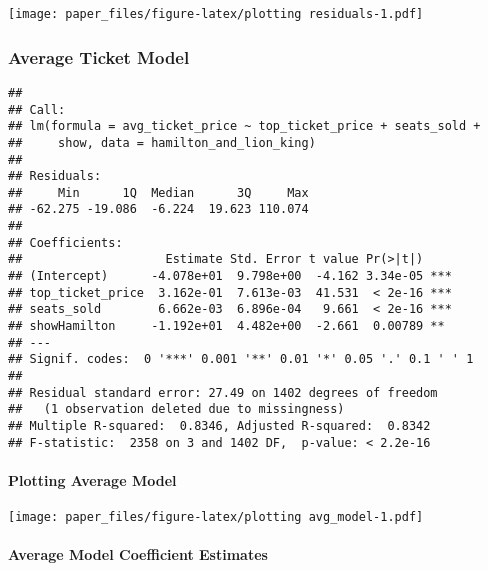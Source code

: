 \documentclass[
]{article}
\begin{document}
\texttt{[image: paper\_files/figure-latex/plotting residuals-1.pdf]}

\hypertarget{average-ticket-model}{%
\subsubsection{Average Ticket Model}\label{average-ticket-model}}

\begin{verbatim}
## 
## Call:
## lm(formula = avg_ticket_price ~ top_ticket_price + seats_sold + 
##     show, data = hamilton_and_lion_king)
## 
## Residuals:
##     Min      1Q  Median      3Q     Max 
## -62.275 -19.086  -6.224  19.623 110.074 
## 
## Coefficients:
##                    Estimate Std. Error t value Pr(>|t|)    
## (Intercept)      -4.078e+01  9.798e+00  -4.162 3.34e-05 ***
## top_ticket_price  3.162e-01  7.613e-03  41.531  < 2e-16 ***
## seats_sold        6.662e-03  6.896e-04   9.661  < 2e-16 ***
## showHamilton     -1.192e+01  4.482e+00  -2.661  0.00789 ** 
## ---
## Signif. codes:  0 '***' 0.001 '**' 0.01 '*' 0.05 '.' 0.1 ' ' 1
## 
## Residual standard error: 27.49 on 1402 degrees of freedom
##   (1 observation deleted due to missingness)
## Multiple R-squared:  0.8346, Adjusted R-squared:  0.8342 
## F-statistic:  2358 on 3 and 1402 DF,  p-value: < 2.2e-16
\end{verbatim}

\hypertarget{plotting-average-model}{%
\paragraph{Plotting Average Model}\label{plotting-average-model}}

\texttt{[image: paper\_files/figure-latex/plotting avg\_model-1.pdf]}

\hypertarget{average-model-coefficient-estimates}{%
\paragraph{Average Model Coefficient Estimates}\label{average-model-coefficient-estimates}}

 
  \providecommand{\huxb}[2]{\arrayrulecolor[RGB]{#1}\global\arrayrulewidth=#2pt}
  \providecommand{\huxvb}[2]{\color[RGB]{#1}\vrule width #2pt}
  \providecommand{\huxtpad}[1]{\rule{0pt}{#1}}
  \providecommand{\huxbpad}[1]{\rule[-#1]{0pt}{#1}}
\end{document}
